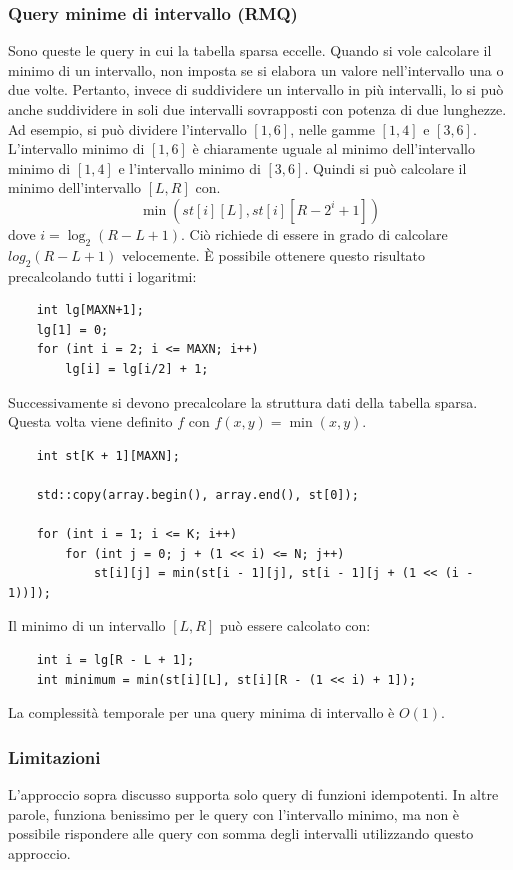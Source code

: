 \documentclass[italian,10pt,a4paper]{article}
\begin{document}
\subsubsection{Query minime di intervallo (RMQ)}
Sono queste le query in cui la tabella sparsa eccelle. Quando si vole calcolare il minimo di un intervallo, non imposta se si elabora un valore nell'intervallo una o due volte. Pertanto, invece di suddividere un intervallo in più intervalli, lo si può anche suddividere in soli due intervalli sovrapposti con potenza di due lunghezze. Ad esempio, si può dividere l'intervallo $[1,6]$, nelle gamme $[1,4]$ e $[3,6]$. L'intervallo minimo di $[1,6]$ è chiaramente uguale al minimo dell'intervallo minimo di $[1,4]$ e l'intervallo minimo di $[3,6]$. Quindi si può calcolare il minimo dell'intervallo $[L,R]$ con.
$$\min(st[i][L], st[i][R-2^i+1])$$ dove $i=\log_2(R-L+1)$. Ciò richiede di essere in grado di calcolare $log_2(R-L+1)$ velocemente. È possibile ottenere questo risultato precalcolando tutti i logaritmi:
\begin{lstlisting}
	int lg[MAXN+1];
	lg[1] = 0;
	for (int i = 2; i <= MAXN; i++)
		lg[i] = lg[i/2] + 1;
\end{lstlisting}

Successivamente si devono precalcolare la struttura dati della tabella sparsa. Questa volta viene definito $f$ con $f(x,y)=\min (x,y)$.
\begin{lstlisting}
	int st[K + 1][MAXN];
	
	std::copy(array.begin(), array.end(), st[0]);
	
	for (int i = 1; i <= K; i++)
		for (int j = 0; j + (1 << i) <= N; j++)
			st[i][j] = min(st[i - 1][j], st[i - 1][j + (1 << (i - 1))]);
\end{lstlisting}
Il minimo di un intervallo $[L,R]$ può essere calcolato con:
\begin{lstlisting}
	int i = lg[R - L + 1];
	int minimum = min(st[i][L], st[i][R - (1 << i) + 1]);
\end{lstlisting}
La complessità temporale per una query minima di intervallo è $O(1)$.
\subsubsection{Limitazioni}L'approccio sopra discusso supporta solo query di funzioni idempotenti. In altre parole, funziona benissimo per le query con l'intervallo minimo, ma non è possibile rispondere alle query con somma degli intervalli utilizzando questo approccio. 
\end{document}

